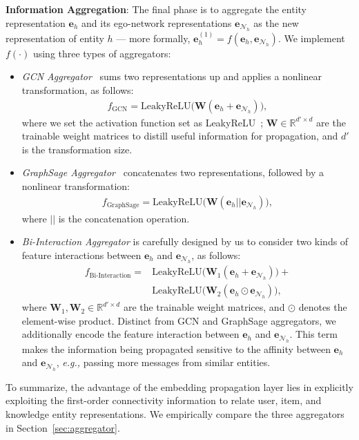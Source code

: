 \documentclass[sigconf]{acmart}
\newcommand{\Mat}[1]{\mathbf{#1}}
\newcommand{\Space}[1]{\mathbb{#1}}
\newcommand{\Set}[1]{\mathcal{#1}}
\newcommand{\eg}{\emph{e.g., }}
\theoremstyle{definition}
\begin{document}
\vspace{5px}
\noindent\textbf{Information Aggregation}:
The final phase is to aggregate the entity representation $\Mat{e}_h$ and its ego-network representations $\Mat{e}_{\Set{N}_{h}}$ as the new representation of entity $h$ --- more formally, $\Mat{e}_{h}^{(1)}=f(\Mat{e}_h,\Mat{e}_{\Set{N}_{h}})$.
We implement $f(\cdot)$ using three types of aggregators:
\begin{itemize}[leftmargin=*]
    \item \emph{GCN Aggregator}~\cite{GCN} sums two representations up and applies a nonlinear transformation, as follows:
        \begin{align}
            f_{\text{GCN}}=\text{LeakyReLU}\Big(\Mat{W}(\Mat{e}_{h} + \Mat{e}_{\Set{N}_{h}})\Big),
        \end{align}
        where we set the activation function set as LeakyReLU~\cite{Nonlinear}; $\Mat{W}\in\Space{R}^{d'\times d}$ are the trainable weight matrices to distill useful information for propagation, and $d'$ is the transformation size.
    
    \item \emph{GraphSage Aggregator}~\cite{GraphSage} concatenates two representations, followed by a nonlinear transformation:
        \begin{align}
            f_{\text{GraphSage}}=\text{LeakyReLU}\Big(\Mat{W}(\Mat{e}_{h} || \Mat{e}_{\Set{N}_{h}})\Big),
        \end{align}
        where $||$ is the concatenation operation.
        
    \item \emph{Bi-Interaction Aggregator} is carefully designed by us to consider two kinds of feature interactions between $\Mat{e}_{h}$ and $\Mat{e}_{\Set{N}_{h}}$, as follows:
        \begin{align}
            f_{\text{Bi-Interaction}}=&\text{LeakyReLU}\Big(\Mat{W}_{1}(\Mat{e}_{h} + \Mat{e}_{\Set{N}_{h}})\Big) +\nonumber\\ &\text{LeakyReLU}\Big(\Mat{W}_{2}(\Mat{e}_{h}\odot\Mat{e}_{\Set{N}_{h}})\Big),
        \end{align}
        where $\Mat{W}_1,\Mat{W}_2\in\Space{R}^{d'\times d}$ are the trainable weight matrices, and $\odot$ denotes the element-wise product. Distinct from GCN and GraphSage aggregators, we additionally encode the feature interaction between $\Mat{e}_{h}$ and $\Mat{e}_{\Set{N}_{h}}$. This term makes the information being propagated sensitive to the affinity between $\Mat{e}_{h}$ and $\Mat{e}_{\Set{N}_{h}}$, \eg passing more messages from similar entities.
\end{itemize}
To summarize, the advantage of the embedding propagation layer lies in explicitly exploiting the first-order connectivity information to relate user, item, and knowledge entity representations.
We empirically compare the three aggregators in Section~\ref{sec:aggregator}.
\end{document}
